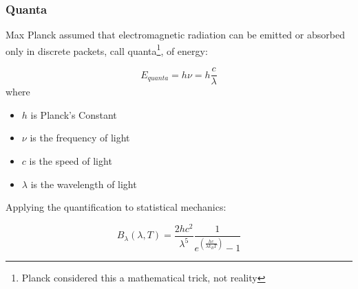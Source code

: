 \documentclass{beamer}
\begin{document}
\begin{frame}\frametitle{Quanta}

Max Planck assumed that electromagnetic radiation can be emitted or absorbed only in discrete packets, call quanta\footnote{Planck considered this a mathematical trick, not reality}, of energy:

\[ E_{quanta} = h \nu = h \frac{c}{\lambda}\]
where
\begin{itemize}
\item $h$ is Planck's Constant
\item $\nu$ is the frequency of light
\item $c$ is the speed of light
\item $\lambda$ is the wavelength of light
\end{itemize}

Applying the quantification to statistical mechanics:

\[ B_{\lambda}(\lambda,T) = \frac{2hc^2}{\lambda^5}\frac{1}{e^{(\frac{hc}{\lambda k_B T})}-1}   \]

\end{frame}
\end{document}
